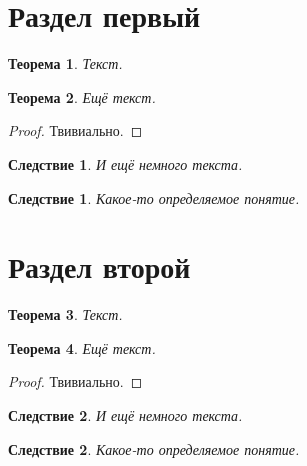 \documentclass[a4paper, 12pt]{article}
\begin{document}
    \theoremstyle{plain} %


    \newtheorem{theorem}{Теорема}[section] %
    \newtheorem{corollary}{Следствие}[theorem] %
    \newtheorem*{definition}{Следствие} %

    \section{Раздел первый}
    \begin{theorem} %
        Текст.
    \end{theorem}
    \begin{theorem} %
        Ещё текст.
    \end{theorem}
    \begin{proof} %
        Твивиально.
    \end{proof}
    \begin{corollary} %
        И ещё немного текста.
    \end{corollary}
    \begin{definition} %
        Какое-то определяемое понятие.
    \end{definition}

    \section{Раздел второй}
    \begin{theorem} %
        Текст.
    \end{theorem}
    \begin{theorem} %
        Ещё текст.
    \end{theorem}
    \begin{proof} %
        Твивиально.
    \end{proof}
    \begin{corollary} %
        И ещё немного текста.
    \end{corollary}
    \begin{definition} %
        Какое-то определяемое понятие.
    \end{definition}
\end{document}
